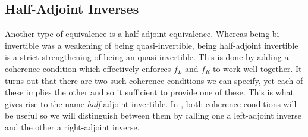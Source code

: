 \documentclass{article}
\theoremstyle{definition}
\theoremstyle{remark}
\begin{document}
\subsection{Half-Adjoint Inverses}\label{sec:hai}

Another type of equivalence is a half-adjoint equivalence. Whereas being bi-invertible was a weakening of being quasi-invertible, being half-adjoint invertible is a strict strengthening of being an quasi-invertible. This is done by adding a coherence condition which effectively enforces \(f_L\) and \(f_R\) to work well together. It turns out that there are two such coherence conditions we can specify, yet each of these implies the other and so it sufficient to provide one of these. This is what gives rise to the name \emph{half}-adjoint invertible. In , both coherence conditions will be useful so we will distinguish between them by calling one a left-adjoint inverse and the other a right-adjoint inverse.
\end{document}
